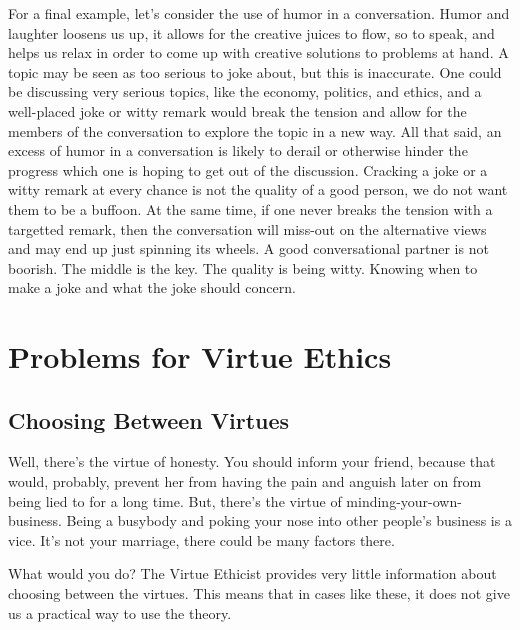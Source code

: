 For a final example, let's consider the use of humor in a conversation. Humor and laughter loosens us up, it allows for the creative juices to flow, so to speak, and helps us relax in order to come up with creative solutions to problems at hand. A topic may be seen as too serious to joke about, but this is inaccurate. One could be discussing very serious topics, like the economy, politics, and ethics, and a well-placed joke or witty remark would break the tension and allow for the members of the conversation to explore the topic in a new way. All that said, an excess of humor in a conversation is likely to derail or otherwise hinder the progress which one is hoping to get out of the discussion. Cracking a joke or a witty remark at every chance is not the quality of a good person, we do not want them to be a buffoon. At the same time, if one never breaks the tension with a targetted remark, then the conversation will miss-out on the alternative views and may end up just spinning its wheels. A good conversational partner is not boorish. The middle is the key. The quality is being witty. Knowing when to make a joke and what the joke should concern. 

\section{Problems for Virtue Ethics}

\subsection{Choosing Between Virtues}


Well, there’s the virtue of honesty. You should inform your friend, because that would, probably, prevent her from having the pain and anguish later on from being lied to for a long time. But, there’s the virtue of minding-your-own-business. Being a busybody and poking your nose into other people’s business is a vice. It’s not your marriage, there could be many factors there.

What would you do? The Virtue Ethicist provides very little information about choosing between the virtues. This means that in cases like these, it does not give us a practical way to use the theory.
